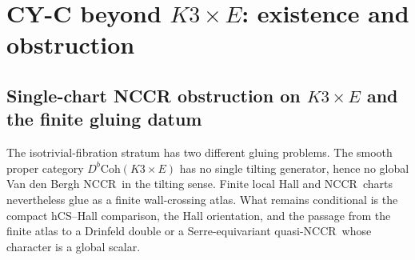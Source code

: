 \chapter{CY-C beyond \texorpdfstring{$K3 \times E$}{K3 x E}: existence and obstruction}
\label{ch:cy-c-beyond-k3e}

\providecommand{\CoHA}{\ensuremath{\mathrm{CoHA}}}
\providecommand{\Coh}{\ensuremath{\mathrm{Coh}}}
\providecommand{\HH}{\ensuremath{\mathrm{HH}}}
\providecommand{\Hilb}{\ensuremath{\mathrm{Hilb}}}
\providecommand{\Eone}{\ensuremath{E_{1}}}
\providecommand{\Etwo}{\ensuremath{E_{2}}}
\providecommand{\kch}{\ensuremath{\kappa_{\mathrm{ch}}}}
\providecommand{\Stab}{\ensuremath{\mathrm{Stab}}}
\providecommand{\LMuk}{\ensuremath{\Lambda_{\mathrm{Muk}}}}
\providecommand{\Ext}{\ensuremath{\mathrm{Ext}}}
\providecommand{\NCCR}{\ensuremath{\mathrm{NCCR}}}
\providecommand{\DT}{\ensuremath{\mathrm{DT}}}
\providecommand{\kBKM}{\ensuremath{\kappa_{\mathrm{BKM}}}}
\providecommand{\SerreS}{\ensuremath{\mathbb{S}}}
\providecommand{\Leech}{\ensuremath{\Lambda_{\mathrm{Leech}}}}
\providecommand{\Sgnt}{\ensuremath{\mathrm{sgn}}}

\section{Single-chart NCCR obstruction on \texorpdfstring{$K3 \times E$}{K3 x E} and the finite gluing datum}
\label{sec:cy-c-beyond-global-nccr-obstruction}

The isotrivial-fibration stratum has two different gluing problems. The
smooth proper category $D^b\Coh(K3\times E)$ has no single tilting
generator, hence no global Van den Bergh \NCCR\ in the tilting sense.
Finite local Hall and \NCCR\ charts nevertheless glue as a finite
wall-crossing atlas. What remains conditional is the compact
hCS--Hall comparison, the Hall orientation, and the passage from the
finite atlas to a Drinfeld double or a Serre-equivariant quasi-\NCCR\
whose character is a global scalar.

